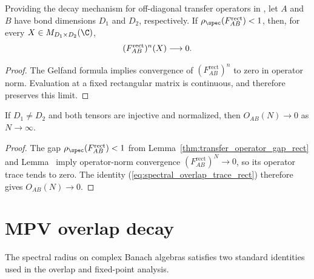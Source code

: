\begin{lemma}%
    \label{thm:rectangular_transfer_pow_zero}
    \leanok
    Providing the decay mechanism for off-diagonal transfer operators in
    \cite[Appendix~B, equations~(B.3)--(B.4) and the paragraph following
        equation~(B.6)]{Cirac2016MPDO_arXiv}, let $A$ and $B$ have bond
    dimensions $D_1$ and $D_2$, respectively. If
    $\rho_{\spec}(F_{AB}^{\mathrm{rect}})<1$, then, for every
    $X\in M_{D_1\times D_2}(\C)$,
    \begin{align}
        (F_{AB}^{\mathrm{rect}})^n(X)\longrightarrow0.
        \notag
    \end{align}
\end{lemma}

\begin{proof}\leanok

    The Gelfand formula implies convergence of
    $(F_{AB}^{\mathrm{rect}})^n$ to zero in operator norm. Evaluation at a
    fixed rectangular matrix is continuous, and therefore preserves this
    limit.
\end{proof}

\begin{lemma}\label{thm:overlap_decay_rect}
    \leanok
    If $D_1\neq D_2$ and both tensors are injective and normalized, then
    $O_{AB}(N)\to0$ as $N\to\infty$.
\end{lemma}

\begin{proof}\leanok
    The gap $\rho_{\spec}(F_{AB}^{\mathrm{rect}})<1$ from
    Lemma~\ref{thm:transfer_operator_gap_rect} and
    Lemma~\cite[``Powers vanish below unit spectral radius'']{QICLean2026Blueprint} imply operator-norm convergence
    $(F_{AB}^{\mathrm{rect}})^N\to0$, so its operator trace tends to zero.
    The identity (\ref{eq:spectral_overlap_trace_rect}) therefore gives
    $O_{AB}(N)\to0$.
\end{proof}

\section{MPV overlap decay}

The spectral radius on complex Banach algebras satisfies two standard
identities used in the overlap and fixed-point analysis.

